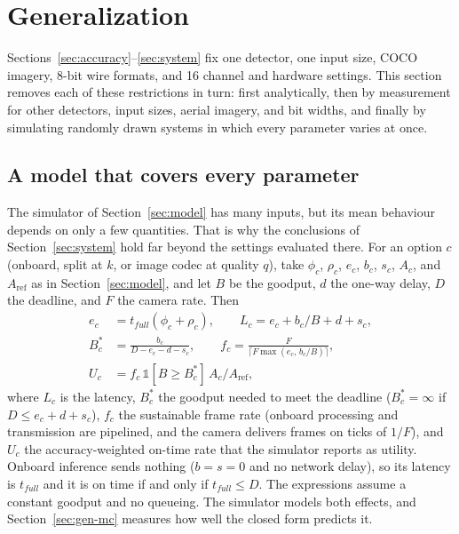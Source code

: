 \documentclass[journal,twocolumn,10pt]{IEEEtran}
\begin{document}
\begin{table}[t]
\centering
\caption{System-model parameters. Assumed values are not measurements; results are reported across the onboard-speed sweep.}
\label{tab:params}
\resizebox{\columnwidth}{!}{}
\end{table}

\section{Generalization}\label{sec:generalization}
Sections~\ref{sec:accuracy}--\ref{sec:system} fix one detector, one input size, COCO imagery, 8-bit wire formats, and 16 channel and hardware settings. This section removes each of these restrictions in turn: first analytically, then by measurement for other detectors, input sizes, aerial imagery, and bit widths, and finally by simulating randomly drawn systems in which every parameter varies at once.
\subsection{A model that covers every parameter}\label{sec:gen-model}
The simulator of Section~\ref{sec:model} has many inputs, but its mean behaviour depends on only a few quantities. That is why the conclusions of Section~\ref{sec:system} hold far beyond the settings evaluated there. For an option $c$ (onboard, split at $k$, or image codec at quality $q$), take $\phi_c$, $\rho_c$, $e_c$, $b_c$, $s_c$, $A_c$, and $A_{\mathrm{ref}}$ as in Section~\ref{sec:model}, and let $B$ be the goodput, $d$ the one-way delay, $D$ the deadline, and $F$ the camera rate. Then
\begin{align*}
e_c &= t_{full}(\phi_c+\rho_c), \qquad L_c = e_c + b_c/B + d + s_c,\\
B^\ast_c &= \frac{b_c}{D-e_c-d-s_c}, \qquad f_c = \frac{F}{\lceil F\max(e_c,\, b_c/B)\rceil},\\
U_c &= f_c\,\mathbb{1}[B\ge B^\ast_c]\,A_c/A_{\mathrm{ref}},
\end{align*}
where $L_c$ is the latency, $B^\ast_c$ the goodput needed to meet the deadline ($B^\ast_c=\infty$ if $D\le e_c+d+s_c$), $f_c$ the sustainable frame rate (onboard processing and transmission are pipelined, and the camera delivers frames on ticks of $1/F$), and $U_c$ the accuracy-weighted on-time rate that the simulator reports as utility. Onboard inference sends nothing ($b=s=0$ and no network delay), so its latency is $t_{full}$ and it is on time if and only if $t_{full}\le D$. The expressions assume a constant goodput and no queueing. The simulator models both effects, and Section~\ref{sec:gen-mc} measures how well the closed form predicts it.
\end{document}
